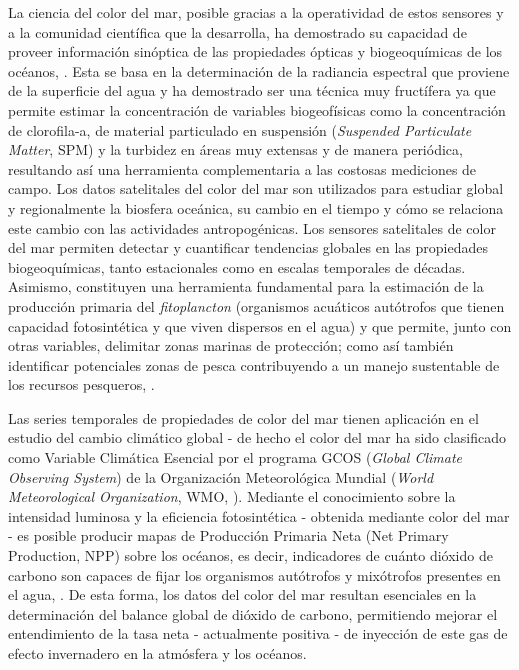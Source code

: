     La ciencia del color del mar, posible gracias a la operatividad de estos sensores y a la comunidad científica que la desarrolla, ha demostrado su capacidad de proveer información sinóptica de las propiedades ópticas y biogeoquímicas de los océanos, \cite{tilstone2003b}\cite{blondeau2014}\cite{odermatt2016}. Esta se basa en la determinación de la radiancia espectral que proviene de la superficie del agua y ha demostrado ser una técnica muy fructífera ya que permite estimar la concentración de variables biogeofísicas como la concentración de clorofila-a, de material particulado en suspensión (\textit{Suspended Particulate Matter}, SPM) y la turbidez en áreas muy extensas y de manera periódica, resultando así una herramienta complementaria a las costosas mediciones de campo. Los datos satelitales del color del mar son utilizados para estudiar global y regionalmente la biosfera oceánica, su cambio en el tiempo y cómo se relaciona este cambio con las actividades antropogénicas. Los sensores satelitales de color del mar permiten detectar y cuantificar tendencias globales en las propiedades biogeoquímicas, tanto estacionales como en escalas temporales de décadas. Asimismo, constituyen una herramienta fundamental para la estimación de la producción primaria del \textit{fitoplancton} (organismos acuáticos autótrofos que tienen capacidad fotosintética y que viven dispersos en el agua) y que permite, junto con otras variables, delimitar zonas marinas de protección; como así también identificar potenciales zonas de pesca contribuyendo a un manejo sustentable de los recursos pesqueros, \cite{ioccg2008}.
    
    Las series temporales de propiedades de color del mar tienen aplicación en el estudio del cambio climático global \cite{dutkiewicz2019} - de hecho el color del mar ha sido clasificado como Variable Climática Esencial por el programa GCOS (\textit{Global Climate Observing System}) de la Organización Meteorológica Mundial (\textit{World Meteorological Organization}, WMO, \cite{wmoweb}). Mediante el conocimiento sobre la intensidad luminosa y la eficiencia fotosintética - obtenida mediante color del mar - es posible producir mapas de Producción Primaria Neta (Net Primary Production, NPP) sobre los océanos, es decir, indicadores de cuánto dióxido de carbono son capaces de fijar los organismos autótrofos y mixótrofos presentes en el agua, \cite{carr2006}. De esta forma, los datos del color del mar resultan esenciales en la determinación del balance global de dióxido de carbono, permitiendo mejorar el entendimiento de la tasa neta - actualmente positiva - de inyección de este gas de efecto invernadero en la atmósfera y los océanos.
    
